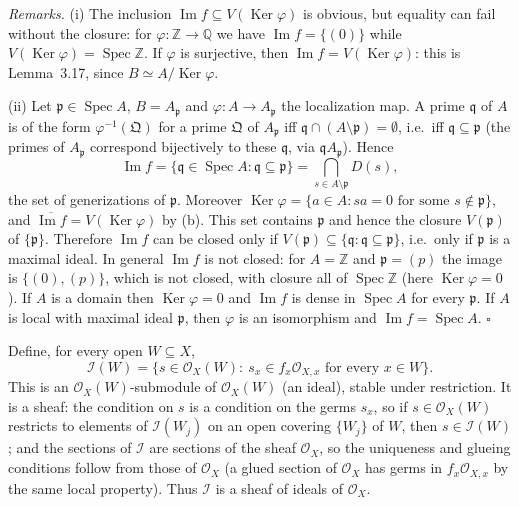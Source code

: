 \documentclass[11pt]{article}
\begin{document}
\emph{Remarks.} (i) The inclusion $\operatorname{Im}f\subseteq V(\operatorname{Ker}\varphi)$ is obvious, but equality can fail without the closure: for $\varphi:\mathbb{Z}\to\mathbb{Q}$ we have $\operatorname{Im}f=\{(0)\}$ while $V(\operatorname{Ker}\varphi)=\operatorname{Spec}\mathbb{Z}$. If $\varphi$ is surjective, then $\operatorname{Im}f=V(\operatorname{Ker}\varphi)$: this is Lemma~3.17, since $B\simeq A/\operatorname{Ker}\varphi$.

(ii) Let $\mathfrak{p}\in\operatorname{Spec}A$, $B=A_{\mathfrak{p}}$ and $\varphi:A\to A_{\mathfrak{p}}$ the localization map. A prime $\mathfrak{q}$ of $A$ is of the form $\varphi^{-1}(\mathfrak{Q})$ for a prime $\mathfrak{Q}$ of $A_{\mathfrak{p}}$ iff $\mathfrak{q}\cap(A\setminus\mathfrak{p})=\emptyset$, i.e.\ iff $\mathfrak{q}\subseteq\mathfrak{p}$ (the primes of $A_{\mathfrak{p}}$ correspond bijectively to these $\mathfrak{q}$, via $\mathfrak{q}A_{\mathfrak{p}}$). Hence
\[ \operatorname{Im}f=\{\mathfrak{q}\in\operatorname{Spec}A:\mathfrak{q}\subseteq\mathfrak{p}\}=\bigcap_{s\in A\setminus\mathfrak{p}}D(s), \]
the set of generizations of $\mathfrak{p}$. Moreover $\operatorname{Ker}\varphi=\{a\in A:sa=0\text{ for some }s\notin\mathfrak{p}\}$, and $\overline{\operatorname{Im}f}=V(\operatorname{Ker}\varphi)$ by (b). This set contains $\mathfrak{p}$ and hence the closure $V(\mathfrak{p})$ of $\{\mathfrak{p}\}$. Therefore $\operatorname{Im}f$ can be closed only if $V(\mathfrak{p})\subseteq\{\mathfrak{q}:\mathfrak{q}\subseteq\mathfrak{p}\}$, i.e.\ only if $\mathfrak{p}$ is a maximal ideal. In general $\operatorname{Im}f$ is not closed: for $A=\mathbb{Z}$ and $\mathfrak{p}=(p)$ the image is $\{(0),(p)\}$, which is not closed, with closure all of $\operatorname{Spec}\mathbb{Z}$ (here $\operatorname{Ker}\varphi=0$). If $A$ is a domain then $\operatorname{Ker}\varphi=0$ and $\operatorname{Im} f$ is dense in $\operatorname{Spec}A$ for every $\mathfrak{p}$. If $A$ is local with maximal ideal $\mathfrak{p}$, then $\varphi$ is an isomorphism and $\operatorname{Im}f=\operatorname{Spec}A$. \hfill$\square$

\pf
Define, for every open $W\subseteq X$,
\[ \mathcal{I}(W)=\{s\in\mathcal{O}_X(W):\ s_x\in f_x\mathcal{O}_{X,x}\text{ for every }x\in W\}. \]
This is an $\mathcal{O}_X(W)$-submodule of $\mathcal{O}_X(W)$ (an ideal), stable under restriction. It is a sheaf: the condition on $s$ is a condition on the germs $s_x$, so if $s\in\mathcal{O}_X(W)$ restricts to elements of $\mathcal{I}(W_j)$ on an open covering $\{W_j\}$ of $W$, then $s\in\mathcal{I}(W)$; and the sections of $\mathcal{I}$ are sections of the sheaf $\mathcal{O}_X$, so the uniqueness and glueing conditions follow from those of $\mathcal{O}_X$ (a glued section of $\mathcal{O}_X$ has germs in $f_x\mathcal{O}_{X,x}$ by the same local property). Thus $\mathcal{I}$ is a sheaf of ideals of $\mathcal{O}_X$.
\end{document}
